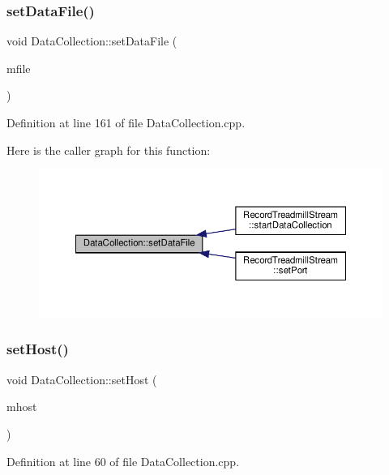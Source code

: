 \subsubsection{\texorpdfstring{set\+Data\+File()}{setDataFile()}}
{\footnotesize\ttfamily void Data\+Collection\+::set\+Data\+File (\begin{DoxyParamCaption}\item[{Q\+File $\ast$}]{mfile }\end{DoxyParamCaption})}



Definition at line 161 of file Data\+Collection.\+cpp.

Here is the caller graph for this function\+:
\nopagebreak
\begin{figure}[H]
\begin{center}
\leavevmode
\includegraphics[width=350pt]{class_data_collection_a72136206b4b1232a442e2ce89c62837a_icgraph}
\end{center}
\end{figure}
\mbox{\label{class_data_collection_a9edfa021943d2cb01774ea5e2dfaa624}} 
\subsubsection{\texorpdfstring{set\+Host()}{setHost()}}
{\footnotesize\ttfamily void Data\+Collection\+::set\+Host (\begin{DoxyParamCaption}\item[{Q\+String}]{mhost }\end{DoxyParamCaption})}



Definition at line 60 of file Data\+Collection.\+cpp.


